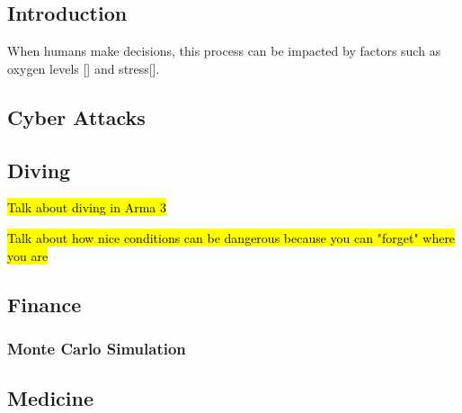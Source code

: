 \documentclass{article}
\begin{document}
\subsection{Introduction}

When humans make decisions, this process can be impacted by factors such as oxygen levels [] and stress[].





\subsection{Cyber Attacks}

\subsection{Diving}

\hl{Talk about diving in Arma 3}

\hl{Talk about how nice conditions can be dangerous because you can "forget" where you are}

\subsection{Finance}

\subsubsection{Monte Carlo Simulation}


\subsection{Medicine}
\end{document}
